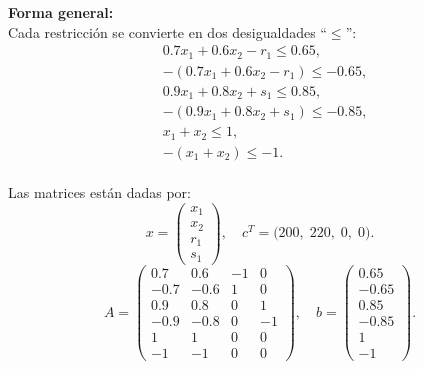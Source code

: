 \textbf{Forma general:}\\

Cada restricción se convierte en dos desigualdades “\(\le\)”:
\[
\begin{aligned}
&0.7x_1 + 0.6x_2 - r_1 \le 0.65,\\
&-(0.7x_1 + 0.6x_2 - r_1)\le -0.65,\\[6pt]
&0.9x_1 + 0.8x_2 + s_1 \le 0.85,\\
&-(0.9x_1 + 0.8x_2 + s_1)\le -0.85,\\[6pt]
&x_1 + x_2 \le 1,\\
&-(x_1 + x_2)\le -1.
\end{aligned}
\]\\

Las matrices están dadas por:
\[
x = \begin{pmatrix}
x_1\\
x_2\\
r_1\\
s_1
\end{pmatrix},\quad
c^T = \bigl(200,\;220,\;0,\;0\bigr).
\]
\[
A = 
\begin{pmatrix}
 0.7 &  0.6 & -1 &  0\\
-0.7 & -0.6 &  1 &  0\\
 0.9 &  0.8 &  0 &  1\\
-0.9 & -0.8 &  0 & -1\\
 1   &  1   &  0 &  0\\
-1   & -1   &  0 &  0
\end{pmatrix},
\quad
b = 
\begin{pmatrix}
 0.65\\
-0.65\\
 0.85\\
-0.85\\
 1\\
-1
\end{pmatrix}.
\]
